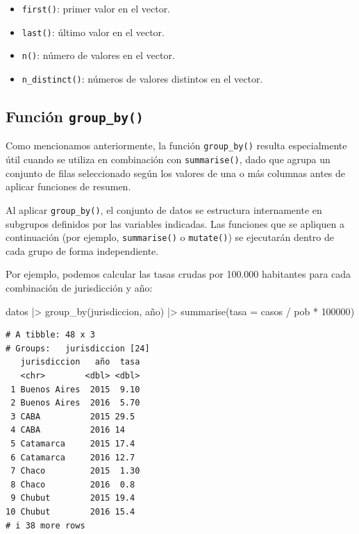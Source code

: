 \documentclass[
  spanish,
  letterpaper,
  DIV=11,
  numbers=noendperiod]{scrreprt}
\newenvironment{Shaded}{\begin{snugshade}}{\end{snugshade}}
\newcommand{\AttributeTok}[1]{\textcolor[rgb]{0.40,0.45,0.13}{#1}}
\newcommand{\DecValTok}[1]{\textcolor[rgb]{0.68,0.00,0.00}{#1}}
\newcommand{\FunctionTok}[1]{\textcolor[rgb]{0.28,0.35,0.67}{#1}}
\newcommand{\NormalTok}[1]{\textcolor[rgb]{0.00,0.23,0.31}{#1}}
\newcommand{\SpecialCharTok}[1]{\textcolor[rgb]{0.37,0.37,0.37}{#1}}
\providecommand{\tightlist}{%
  \setlength{\itemsep}{0pt}\setlength{\parskip}{0pt}}
\begin{document}
\begin{itemize}
\tightlist
\item
  \texttt{first()}: primer valor en el vector.
\item
  \texttt{last()}: último valor en el vector.
\item
  \texttt{n()}: número de valores en el vector.
\item
  \texttt{n\_distinct()}: números de valores distintos en el vector.
\end{itemize}

\subsection{\texorpdfstring{Función
\texttt{group\_by()}}{Función group\_by()}}\label{funciuxf3n-group_by}

Como mencionamos anteriormente, la función \texttt{group\_by()} resulta
especialmente útil cuando se utiliza en combinación con
\texttt{summarise()}, dado que agrupa un conjunto de filas seleccionado
según los valores de una o más columnas antes de aplicar funciones de
resumen.

Al aplicar \texttt{group\_by()}, el conjunto de datos se estructura
internamente en subgrupos definidos por las variables indicadas. Las
funciones que se apliquen a continuación (por ejemplo,
\texttt{summarise()} o \texttt{mutate()}) se ejecutarán dentro de cada
grupo de forma independiente.

Por ejemplo, podemos calcular las tasas crudas por 100.000 habitantes
para cada combinación de jurisdicción y año:

\begin{Shaded}
\begin{Highlighting}[]
\NormalTok{datos }\SpecialCharTok{|\textgreater{}}
  \FunctionTok{group\_by}\NormalTok{(jurisdiccion, año) }\SpecialCharTok{|\textgreater{}}
  \FunctionTok{summarise}\NormalTok{(}\AttributeTok{tasa =}\NormalTok{ casos }\SpecialCharTok{/}\NormalTok{ pob }\SpecialCharTok{*} \DecValTok{100000}\NormalTok{)}
\end{Highlighting}
\end{Shaded}

\begin{verbatim}
# A tibble: 48 x 3
# Groups:   jurisdiccion [24]
   jurisdiccion   año  tasa
   <chr>        <dbl> <dbl>
 1 Buenos Aires  2015  9.10
 2 Buenos Aires  2016  5.70
 3 CABA          2015 29.5 
 4 CABA          2016 14   
 5 Catamarca     2015 17.4 
 6 Catamarca     2016 12.7 
 7 Chaco         2015  1.30
 8 Chaco         2016  0.8 
 9 Chubut        2015 19.4 
10 Chubut        2016 15.4 
# i 38 more rows
\end{verbatim}
\end{document}
